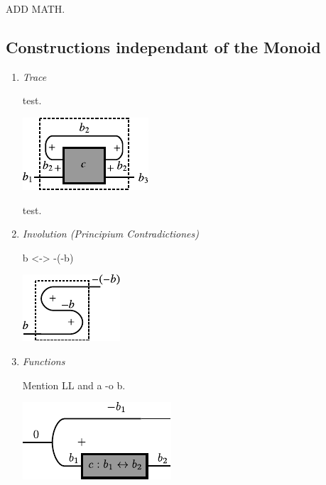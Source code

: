 \documentclass[preprint]{sigplanconf}
\begin{document}
ADD MATH. 


\subsection{Constructions independant of the  Monoid}
\label{sec:monoidal-constructions}

\begin{enumerate}
\item 
\emph{Trace}

test.

\begin{multicols}{2}
\begin{center}
  \includegraphics{diagrams/trace.pdf}
\end{center}


\end{multicols}

test. 

\item
\emph{Involution (Principium Contradictiones)}

{{b <-> -(-b)}}

\begin{center}
  \includegraphics{diagrams/double_neg.pdf}
\end{center}

\item
\emph{Functions}

Mention LL and {{a -o b}}.

\begin{center}
  \includegraphics{diagrams/function.pdf}
\end{center}


\end{enumerate}
\end{document}
